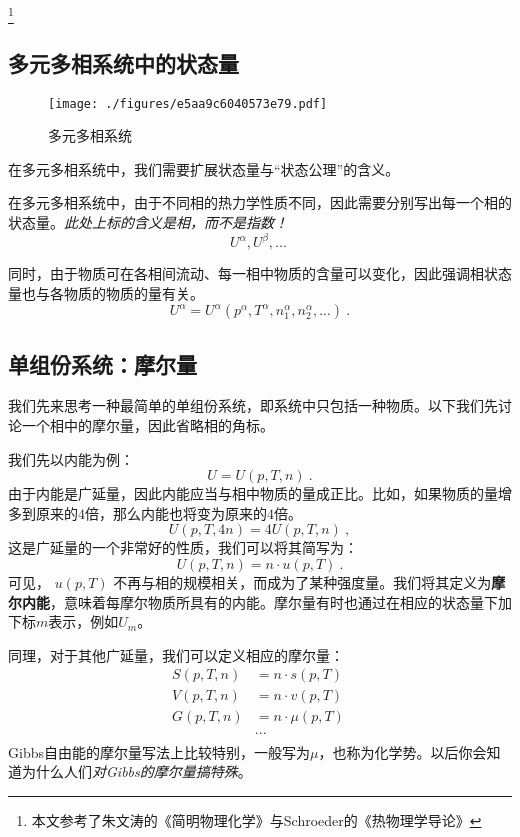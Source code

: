 
\footnote{本文参考了朱文涛的《简明物理化学》与Schroeder的《热物理学导论》}

\subsection{多元多相系统中的状态量}
\begin{figure}[ht]
\centering
\texttt{[image: ./figures/e5aa9c6040573e79.pdf]}
\caption{多元多相系统} \label{fig_ParMol_1}
\end{figure}

在多元多相系统中，我们需要扩展状态量与“状态公理”的含义。

在多元多相系统中，由于不同相的热力学性质不同，因此需要分别写出每一个相的状态量。\textsl{此处上标的含义是相，而不是指数！}
$$U^\alpha, U^\beta,...~$$

同时，由于物质可在各相间流动、每一相中物质的含量可以变化，因此强调相状态量也与各物质的物质的量有关。
$$U^\alpha = U^\alpha (p^\alpha, T^\alpha, n_1^\alpha,n_2^\alpha,...)~.$$

\subsection{单组份系统：摩尔量}
我们先来思考一种最简单的单组份系统，即系统中只包括一种物质。以下我们先讨论一个相中的摩尔量，因此省略相的角标。

我们先以内能为例：
$$U = U (p, T, n)~.$$
由于内能是广延量，因此内能应当与相中物质的量成正比。比如，如果物质的量增多到原来的$4$倍，那么内能也将变为原来的$4$倍。
$$U(p, T, 4 n) = 4 U (p, T, n)~,$$
这是广延量的一个非常好的性质，我们可以将其简写为：
$$U(p, T, n) = n \cdot u (p, T)~.$$
可见， $u (p, T)$ 不再与相的规模相关，而成为了某种强度量。我们将其定义为\textbf{摩尔内能}，意味着每摩尔物质所具有的内能。摩尔量有时也通过在相应的状态量下加下标$m$表示，例如$U_m$。

同理，对于其他广延量，我们可以定义相应的摩尔量：
$$
\begin{aligned}
S(p, T, n) &= n \cdot s (p, T)\\
V(p, T, n) &= n \cdot v (p, T)\\
G(p, T, n) &= n \cdot \mu (p, T)\\
&...\\
\end{aligned}~
$$
Gibbs自由能的摩尔量写法上比较特别，一般写为$\mu$，也称为化学势。以后你会知道为什么人们\textsl{对Gibbs的摩尔量搞特殊}。

